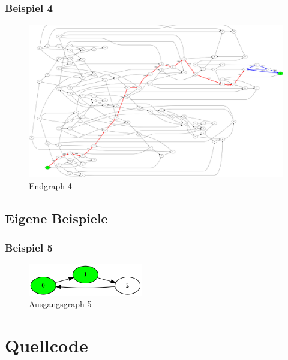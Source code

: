 \documentclass[a4paper,10pt,ngerman]{scrartcl}
\begin{document}
      \subsubsection{Beispiel 4}
        
        \begin{figure}[H]
          \centering
          \includegraphics[width=15cm]{../beispielausgaben/huepfburg4_end.png}
          \caption{Endgraph 4}
          \label{fig:Endgraph4}
        \end{figure}

    \subsection{Eigene Beispiele}
      
      \subsubsection{Beispiel 5}
        \begin{figure}[H]
          \centering
          \includegraphics[width=5cm]{../beispielausgaben/huepfburg5.png}
          \caption{Ausgangsgraph 5}
          \label{fig:Ausgangsgraph5}
        \end{figure}

        
        
  \section{Quellcode}
    
\end{document}
